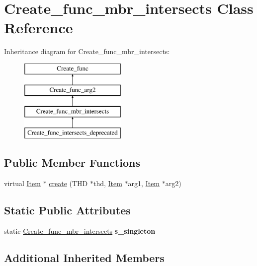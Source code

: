 \hypertarget{classCreate__func__mbr__intersects}{}\section{Create\+\_\+func\+\_\+mbr\+\_\+intersects Class Reference}
\label{classCreate__func__mbr__intersects}
Inheritance diagram for Create\+\_\+func\+\_\+mbr\+\_\+intersects\+:\begin{figure}[H]
\begin{center}
\leavevmode
\includegraphics[height=4.000000cm]{classCreate__func__mbr__intersects}
\end{center}
\end{figure}
\subsection*{Public Member Functions}
\begin{DoxyCompactItemize}
\item 
virtual \mbox{\hyperlink{classItem}{Item}} $\ast$ \mbox{\hyperlink{classCreate__func__mbr__intersects_a0ec3a76f5008394a1f0aaa32572d766e}{create}} (T\+HD $\ast$thd, \mbox{\hyperlink{classItem}{Item}} $\ast$arg1, \mbox{\hyperlink{classItem}{Item}} $\ast$arg2)
\end{DoxyCompactItemize}
\subsection*{Static Public Attributes}
\begin{DoxyCompactItemize}
\item 
\mbox{\label{classCreate__func__mbr__intersects_aee96464d5568161af03a7cfb68963d07}} 
static \mbox{\hyperlink{classCreate__func__mbr__intersects}{Create\+\_\+func\+\_\+mbr\+\_\+intersects}} {\bfseries s\+\_\+singleton}
\end{DoxyCompactItemize}
\subsection*{Additional Inherited Members}


